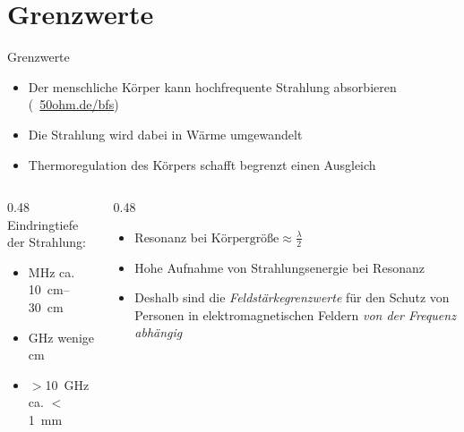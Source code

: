 \section{Grenzwerte}
\label{section:personenschutzabstand_frequenzabhaengig}
\begin{frame}{Grenzwerte}
    \begin{itemize}
        \item Der menschliche Körper kann hochfrequente Strahlung absorbieren (\textcolor{DARCblue}{\faLink~\href{https://50ohm.de/bfs}{50ohm.de/bfs}})
        \item Die Strahlung wird dabei in Wärme umgewandelt
        \item Thermoregulation des Körpers schafft begrenzt einen Ausgleich
    \end{itemize}
    \vspace{10pt}

    \begin{columns}[T]
        \begin{column}{0.48\textwidth}
            Eindringtiefe der Strahlung:

            \begin{itemize}
                \item MHz ca. \qtyrange{10}{30}{\centi\metre}
                \item GHz wenige cm
                \item $>$\qty{10}{\giga\hertz} ca. $<$ \qty{1}{\milli\metre}
            \end{itemize}

        \end{column}
        \begin{column}{0.48\textwidth}
            \begin{itemize}
                \item Resonanz bei $\textrm{Körpergröße} \approx \frac{\lambda}{2}$
                \item Hohe Aufnahme von Strahlungsenergie bei Resonanz
                \item Deshalb sind die \emph{Feldstärkegrenzwerte} für den Schutz von Personen in elektromagnetischen Feldern \emph{von der Frequenz abhängig}
            \end{itemize}

        \end{column}
    \end{columns}
\end{frame}


